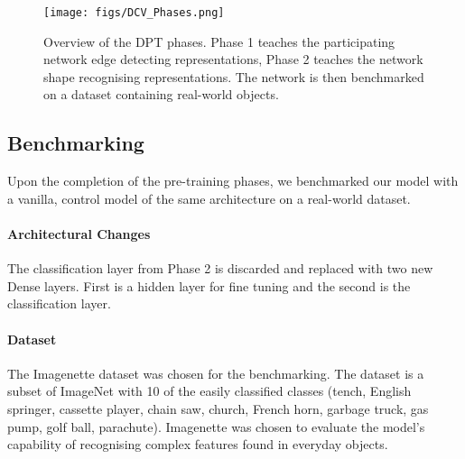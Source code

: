 \begin{figure}
  \centering
  \texttt{[image: figs/DCV\_Phases.png]}
  \caption{Overview of the DPT phases. Phase 1 teaches the participating network edge detecting representations, Phase 2 teaches the network shape recognising representations. The network is then benchmarked on a dataset containing real-world objects.}
  \label{fig:fig1}
\end{figure}

\subsection{Benchmarking}
Upon the completion of the pre-training phases, we benchmarked our model with a vanilla, control model of the same architecture on a real-world dataset.
\paragraph{Architectural Changes}The classification layer from Phase 2 is discarded and replaced with two new Dense layers. First is a hidden layer for fine tuning and the second is the classification layer.
\paragraph{Dataset}The Imagenette dataset \cite{imagenette} was chosen for the benchmarking. The dataset is a subset of ImageNet with 10 of the easily classified classes (tench, English springer, cassette player, chain saw, church, French horn, garbage truck, gas pump, golf ball, parachute). Imagenette was chosen to evaluate the model's capability of recognising complex features found in everyday objects.


